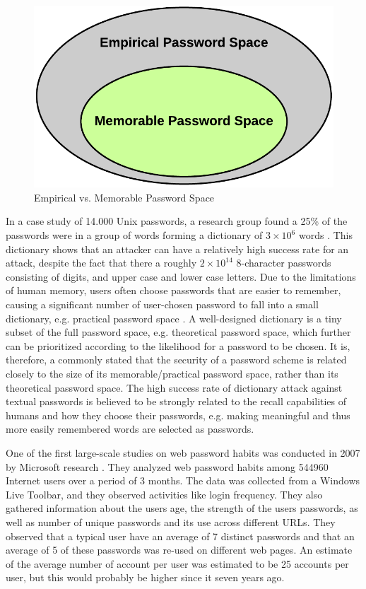  \begin{figure}[H]
      \centering
      \includegraphics[scale=0.25]{pics/EmpiricalVsPractical.png}
      \caption{Empirical vs. Memorable Password Space}
      \label{fig:memorable}
    \end{figure}

  In a case study of 14.000 Unix passwords, a research group found a 25\% of the passwords were in a group of words forming a dictionary of $3\times10^{6}$ words \cite{UnixPasswords}. This dictionary shows that an attacker can have a relatively high success rate for an attack, despite the fact that there a roughly $2\times10^{14}$ 8-character passwords consisting of digits, and upper case and lower case letters. Due to the limitations of human memory, users often choose passwords that are easier to remember, causing a significant number of user-chosen password to fall into a small dictionary, e.g. practical password space \cite{Tao}. A well-designed dictionary is a tiny subset of the full password space, e.g. theoretical password space, which further can be prioritized according to the likelihood for a password to be chosen. It is, therefore, a commonly stated that the security of a password scheme is related closely to the size of its memorable/practical password space, rather than its theoretical password space. The high success rate of dictionary attack against textual passwords is believed to be strongly related to the recall capabilities of humans and how they choose their passwords, e.g. making meaningful and thus more easily remembered words are selected as passwords.

  One of the first large-scale studies on web password habits was conducted in 2007 by Microsoft research \cite{habits1}. They analyzed web password habits among 544960 Internet users over a period of 3 months. The data was collected from a Windows Live Toolbar, and they observed activities like login frequency. They also gathered information about the users age, the strength of the users passwords, as well as number of unique passwords and its use across different URLs. They observed that a typical user have an average of 7 distinct passwords and that an average of 5 of these passwords was re-used on different web pages. An estimate of the average number of account per user was estimated to be 25 accounts per user, but this would probably be higher since it seven years ago.

